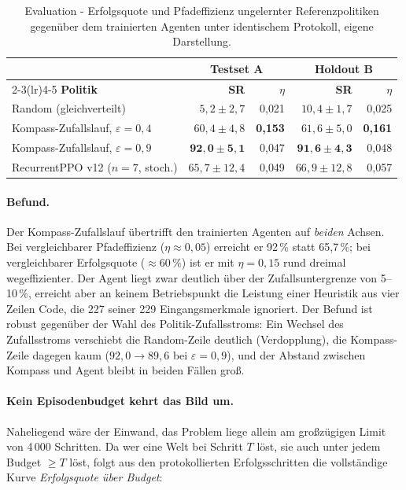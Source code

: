 \documentclass[11pt,a4paper]{article}
\begin{document}
\begin{table}[h]
\centering
\small
\begin{tabular}{@{}lrrrr@{}}
\toprule
& \multicolumn{2}{c}{\textbf{Testset A}} & \multicolumn{2}{c}{\textbf{Holdout B}} \\
\cmidrule(lr){2-3}\cmidrule(lr){4-5}
\textbf{Politik} & \textbf{SR} & \textbf{$\eta$} & \textbf{SR} & \textbf{$\eta$} \\
\midrule
Random (gleichverteilt) & $5{,}2 \pm 2{,}7$ & 0{,}021 & $10{,}4 \pm 1{,}7$ & 0{,}025 \\
Kompass-Zufallslauf, $\varepsilon = 0{,}4$ & $60{,}4 \pm 4{,}8$ & \textbf{0{,}153} & $61{,}6 \pm 5{,}0$ & \textbf{0{,}161} \\
Kompass-Zufallslauf, $\varepsilon = 0{,}9$ & $\mathbf{92{,}0 \pm 5{,}1}$ & 0{,}047 & $\mathbf{91{,}6 \pm 4{,}3}$ & 0{,}048 \\
\midrule
RecurrentPPO v12 ($n=7$, stoch.) & $65{,}7 \pm 12{,}4$ & 0{,}049 & $66{,}9 \pm 12{,}8$ & 0{,}057 \\
\bottomrule
\end{tabular}
\caption[Ungelernte Referenzpolitiken gegenüber dem trainierten Agenten]{Evaluation -
Erfolgsquote und Pfadeffizienz ungelernter Referenzpolitiken gegenüber dem
trainierten Agenten unter identischem Protokoll, eigene Darstellung.}
\label{tab:baselines}
\end{table}

\paragraph{Befund.} Der Kompass-Zufallslauf übertrifft den trainierten Agenten
auf \emph{beiden} Achsen. Bei vergleichbarer Pfadeffizienz
($\eta \approx 0{,}05$) erreicht er 92\,\% statt 65{,}7\,\%; bei
vergleichbarer Erfolgsquote ($\approx 60\,\%$) ist er mit $\eta = 0{,}15$ rund
dreimal wegeffizienter. Der Agent liegt zwar deutlich über der
Zufallsuntergrenze von 5--10\,\%, erreicht aber an keinem Betriebspunkt die
Leistung einer Heuristik aus vier Zeilen Code, die 227 seiner 229
Eingangsmerkmale ignoriert. Der Befund ist robust gegenüber der Wahl des
Politik-Zufallsstroms: Ein Wechsel des Zufallsstroms verschiebt die
Random-Zeile deutlich (Verdopplung), die Kompass-Zeile dagegen kaum
($92{,}0 \to 89{,}6$ bei $\varepsilon = 0{,}9$), und der Abstand zwischen
Kompass und Agent bleibt in beiden Fällen groß.

\paragraph{Kein Episodenbudget kehrt das Bild um.} Naheliegend wäre der
Einwand, das Problem liege allein am großzügigen Limit von 4\,000 Schritten.
Da wer eine Welt bei Schritt $T$ löst, sie auch unter jedem Budget $\geq T$
löst, folgt aus den protokollierten Erfolgsschritten die vollständige Kurve
\emph{Erfolgsquote über Budget}:
\end{document}
